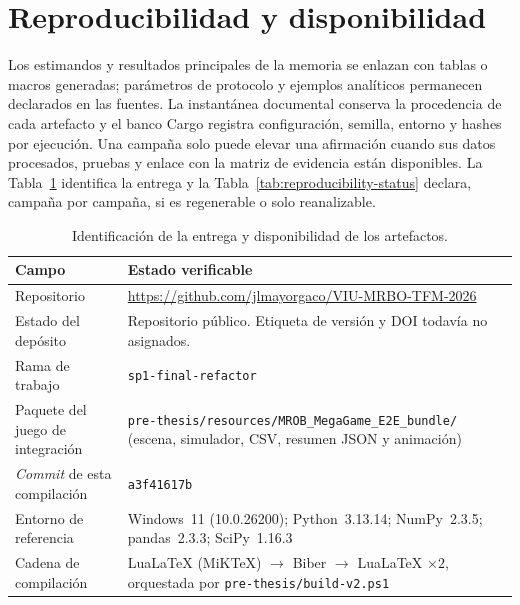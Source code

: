 \section{Reproducibilidad y disponibilidad}
\label{app:reproducibility}

Los estimandos y resultados principales de la memoria se enlazan con tablas o
macros generadas; parámetros de protocolo y ejemplos analíticos permanecen
declarados en las fuentes. La instantánea documental conserva la procedencia de
cada artefacto y el banco Cargo registra configuración, semilla, entorno y
hashes por ejecución. Una campaña solo puede elevar una afirmación cuando sus
datos procesados, pruebas y enlace con la matriz de evidencia están
disponibles. La Tabla~\ref{tab:deposit-identification} identifica la entrega y
la Tabla~\ref{tab:reproducibility-status} declara, campaña por campaña, si es
regenerable o solo reanalizable.

\begin{table}[!htbp]
  \centering
  \caption{Identificación de la entrega y disponibilidad de los artefactos.}
  \label{tab:deposit-identification}
  \viutablefont
  \setlength{\tabcolsep}{3pt}
  \begin{tabularx}{\textwidth}{@{}p{3.1cm}X@{}}
    \toprule
    Campo & Estado verificable \\
    \midrule
    Repositorio & \url{https://github.com/jlmayorgaco/VIU-MRBO-TFM-2026} \\
    Estado del depósito & Repositorio público. Etiqueta de versión y DOI todavía no asignados. \\
    Rama de trabajo & \texttt{sp1-final-refactor} \\
    Paquete del juego de integración & \texttt{pre-thesis/resources/}\allowbreak\texttt{MROB\_MegaGame\_E2E\_bundle/} (escena, simulador, CSV, resumen JSON y animación) \\
    \emph{Commit} de esta compilación & \texttt{a3f41617b} \\
    Entorno de referencia & Windows~11 (10.0.26200); Python~3.13.14; NumPy~2.3.5; pandas~2.3.3; SciPy~1.16.3 \\
    Cadena de compilación & LuaLaTeX (MiKTeX) $\to$ Biber $\to$ LuaLaTeX $\times 2$, orquestada por \texttt{pre-thesis/build-v2.ps1} \\
    \bottomrule
  \end{tabularx}
  \viuownsource
\end{table}

